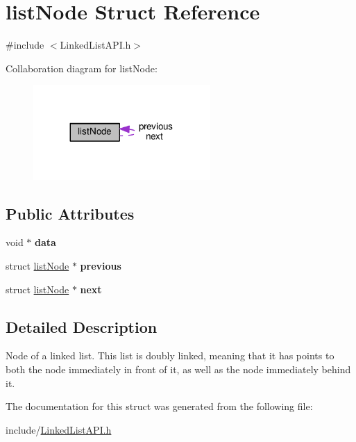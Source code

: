 \hypertarget{structlistNode}{}\section{list\+Node Struct Reference}
\label{structlistNode}


{\ttfamily \#include $<$Linked\+List\+A\+P\+I.\+h$>$}



Collaboration diagram for list\+Node\+:
\nopagebreak
\begin{figure}[H]
\begin{center}
\leavevmode
\includegraphics[width=191pt]{structlistNode__coll__graph}
\end{center}
\end{figure}
\subsection*{Public Attributes}
\begin{DoxyCompactItemize}
\item 
\mbox{\label{structlistNode_a3d954805822577bf67d0a53a99bb337a}} 
void $\ast$ {\bfseries data}
\item 
\mbox{\label{structlistNode_af4cb79db629800938019f92ce510c157}} 
struct \hyperlink{structlistNode}{list\+Node} $\ast$ {\bfseries previous}
\item 
\mbox{\label{structlistNode_a860785ea27fb1c044d6a59ba491dd6ab}} 
struct \hyperlink{structlistNode}{list\+Node} $\ast$ {\bfseries next}
\end{DoxyCompactItemize}


\subsection{Detailed Description}
Node of a linked list. This list is doubly linked, meaning that it has points to both the node immediately in front of it, as well as the node immediately behind it. 

The documentation for this struct was generated from the following file\+:\begin{DoxyCompactItemize}
\item 
include/\hyperlink{LinkedListAPI_8h}{Linked\+List\+A\+P\+I.\+h}\end{DoxyCompactItemize}
